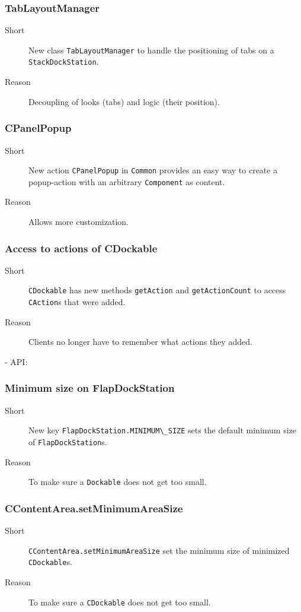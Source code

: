 \documentclass[a4paper,10pt]{article}
\newcommand{\src}[1]{\lstinline[basicstyle=\normalsize\ttfamily,keywordstyle=\normalsize\ttfamily,identifierstyle=\normalsize\ttfamily]|#1|}
\newcommand{\short}{\item[Short]}
\newcommand{\why}{\item[Reason]}
\begin{document}
\subsubsection{TabLayoutManager}
\begin{description}
 \short New class \src{TabLayoutManager} to handle the positioning of tabs on a \src{StackDockStation}.
 \why Decoupling of looks (tabs) and logic (their position). 
\end{description}

\subsubsection{CPanelPopup}
\begin{description}
 \short New action \src{CPanelPopup} in \src{Common} provides an easy way to create a popup-action with an arbitrary \src{Component} as content.
 \why Allows more customization.
\end{description}

\subsubsection{Access to actions of CDockable}
\begin{description}
 \short \src{CDockable} has new methods \src{getAction} and \src{getActionCount} to access \src{CAction}s that were added. 
 \why Clients no longer have to remember what actions they added.
\end{description}

- API: 
\subsubsection{Minimum size on FlapDockStation}
\begin{description}
 \short New key \src{FlapDockStation.MINIMUM\_SIZE} sets the default minimum size of \src{FlapDockStation}s.
 \why To make sure a \src{Dockable} does not get too small.
\end{description}

\subsubsection{CContentArea.setMinimumAreaSize}
\begin{description}
 \short \src{CContentArea.setMinimumAreaSize} set the minimum size of minimized \src{CDockable}s.
 \why To make sure a \src{CDockable} does not get too small.
\end{description}
\end{document}
